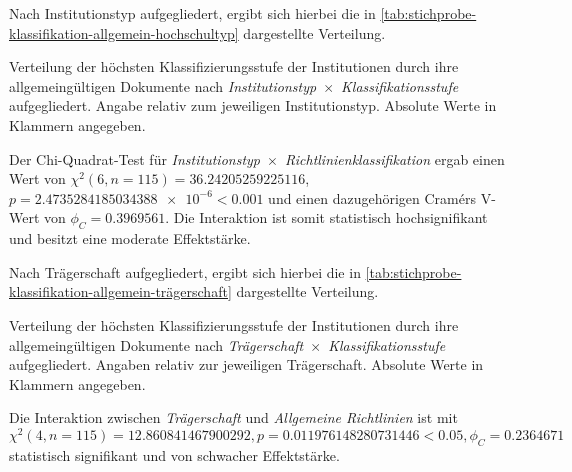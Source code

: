 Nach Institutionstyp aufgegliedert, ergibt sich hierbei die in \cref{tab:stichprobe-klassifikation-allgemein-hochschultyp} dargestellte Verteilung.
\begin{table}[!htbp]
	\caption{Verteilung der höchsten Klassifizierungsstufe der Institutionen durch ihre allgemeingültigen Dokumente nach \textit{Institutionstyp}~$\times$~\textit{Klassifikationsstufe} aufgegliedert.
    Angabe relativ zum jeweiligen Institutionstyp.
    Absolute Werte in Klammern angegeben.}
    
	\label{tab:stichprobe-klassifikation-allgemein-hochschultyp}
\end{table}
Der Chi-Quadrat-Test für \textit{Institutionstyp}~$\times$~\textit{Richtlinienklassifikation} ergab einen Wert von $\chi^2 (\num{6}, n=\num{115}) = \num[round-mode=places,round-precision=2]{36,24205259225116}$, $p = \num[round-mode=places,round-precision=2]{2,4735284185034388e-6}<\num{0.001}$ und einen dazugehörigen Cramérs V-Wert von $\phi_C=\num[round-mode=places,round-precision=2]{0.3969561}$.
Die Interaktion ist somit statistisch hochsignifikant und besitzt eine moderate Effektstärke.


Nach Trägerschaft aufgegliedert, ergibt sich hierbei die in \cref{tab:stichprobe-klassifikation-allgemein-trägerschaft} dargestellte Verteilung.
\begin{table}[!htbp]
	\caption{Verteilung der höchsten Klassifizierungsstufe der Institutionen durch ihre allgemeingültigen Dokumente nach \textit{Trägerschaft}~$\times$~\textit{Klassifikationsstufe} aufgegliedert.
    Angaben relativ zur jeweiligen Trägerschaft.
    Absolute Werte in Klammern angegeben.}
    
	\label{tab:stichprobe-klassifikation-allgemein-trägerschaft}
\end{table}
Die Interaktion zwischen \textit{Trägerschaft} und \textit{Allgemeine Richtlinien} ist mit $\chi^2 (\num{4}, n=\num{115}) = \num[round-mode=places,round-precision=2]{12,860841467900292}, p = \num[round-mode=places,round-precision=2]{0,011976148280731446}<\num{0.05},\phi_C=\num[round-mode=places,round-precision=2]{0.2364671}$ statistisch signifikant und von schwacher Effektstärke.


